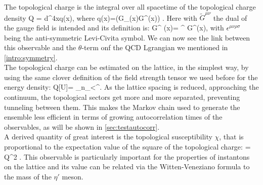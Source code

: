 The topological charge is the integral over all spacetime of the topological charge density
\beq
    Q = \int d^4xq(x),
\eeq
where
\beq 
    q(x)=\Tr(G_{\mu\nu}(x)\tilde G^{\mu\nu}(x)) .
\eeq 
Here with $\tilde G^{\mu\nu}$ the dual of the gauge field is intended and its definition is:
\beq
\tilde G^{\mu\nu} (x)= \epsilon^{\mu\nu\rho\sigma} G^{\rho\sigma}(x),
\eeq
with $\epsilon^{\mu\nu\rho\sigma}$ being the anti-symmetric Levi-Civita symbol. We can now see the link between this observable and the $\theta$-term onf the QCD Lgrangian we mentioned in \cref{intro:symmetry}.\\
The topological charge can be estimated on the lattice, in the simplest way, by using the same clover definition of the field strength tensor we used before for the energy density:
\beq
    Q[U]= \sum_{n\in\Lambda}\sum_{\mu<\nu}\epsilon^{\mu\nu\rho\sigma}.
\eeq
As the lattice spacing is reduced, approaching the continuum, the topological sectors get more and more separated, preventing tunneling between them. This makes the Markov chain used to generate the ensemble less efficient in terms of growing autocorrelation times of the observables, as will be shown in \cref{sec:testautocorr}.\\
A derived quantity of great interest is the topological susceptibility $\chi$, that is proportional to the expectation value of the square of the topological charge:
\beq
    \chi = \langle Q^2 \rangle.
    \label{eq:topsus}
\eeq
This observable is particularly important for the properties of instantons on the lattice and its value can be related via the Witten-Veneziano formula \cite{witten_current_1979} to the mass of the $\eta'$ meson.

